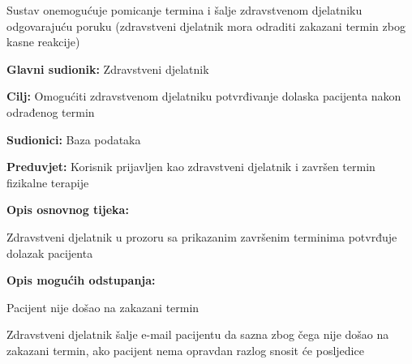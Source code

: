 \begin{packed_item}
\begin{packed_item}
\begin{packed_enum}
								\item Sustav onemogućuje pomicanje termina i šalje zdravstvenom djelatniku odgovarajuću poruku (zdravstveni djelatnik mora odraditi zakazani termin zbog kasne reakcije)
								
							\end{packed_enum}
							
						\end{packed_item}
					\end{packed_item}
					
					\noindent {}
					\begin{packed_item}
						
						\item \textbf{Glavni sudionik: }Zdravstveni djelatnik
						\item  \textbf{Cilj:} Omogućiti zdravstvenom djelatniku potvrđivanje dolaska pacijenta nakon odrađenog termin
						\item  \textbf{Sudionici:} Baza podataka
						\item  \textbf{Preduvjet:} Korisnik prijavljen kao zdravstveni djelatnik i završen termin fizikalne terapije
						\item  \textbf{Opis osnovnog tijeka:}
						
						\item[] \begin{packed_enum}
							
							\item Zdravstveni djelatnik u prozoru sa prikazanim završenim terminima potvrđuje dolazak pacijenta
						\end{packed_enum}
						
						\item  \textbf{Opis mogućih odstupanja:}
						
						\item[] \begin{packed_item}
							
							\item[1.a] Pacijent nije došao na zakazani termin
							\item[] \begin{packed_enum}
								
								\item Zdravstveni djelatnik šalje e-mail pacijentu da sazna zbog čega nije došao na zakazani termin, ako pacijent nema opravdan razlog snosit će posljedice
								
							\end{packed_enum}
						
						\end{packed_item}
						
					\end{packed_item}
					
